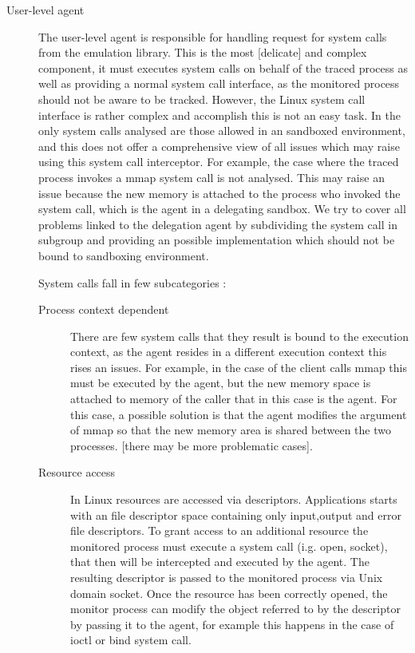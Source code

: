 \begin{description}
	\item[User-level agent]  The user-level agent is responsible for handling request for system calls from the emulation library. This is the most [delicate] and complex 
							 component, it must executes system calls on behalf of the traced process as well as providing a normal system call interface, as the monitored
							 process should not be aware to be tracked. However, the Linux system call interface is rather complex and accomplish this is not an easy task. 
							 In \citep{Garfinkel03ostia:a} the only system calls analysed are those  allowed in an sandboxed environment, and this does not offer a
							 comprehensive view of all issues which may raise using this system call interceptor. For example, the case where the traced process invokes a mmap 
							 system call is not analysed. This may raise an issue because the new memory is attached to the process who invoked the system call, which is the 
							 agent in a delegating sandbox. We try to cover all problems linked to the delegation agent by subdividing the system call in subgroup and providing
							  an possible implementation which should not be bound to sandboxing environment. 
							 
							 System calls fall in few subcategories : 
							 
							 \begin{description}
							 \item[Process context dependent] There are few system calls that they result is bound to the execution context, as the agent resides in a different 
							 								  execution context this rises an issues. For example, in the case of the client calls mmap this must be executed 
							 								  by the agent, but the new memory space is attached to memory of the caller that in this case is the agent. 
							 								  For this case, a possible solution is that the agent modifies the argument of mmap so that the new memory area 
							 								  is shared between the two processes. [there may be more problematic cases].   
							 								
							 \item[Resource access] In Linux resources are accessed via descriptors. Applications starts with an file descriptor space containing only
							 						input,output and error file descriptors. To grant access to an additional resource the monitored process must execute a 
							 						system call (i.g. open, socket), that then will be intercepted and executed by the agent. The resulting descriptor is
							 						passed to the monitored process via Unix domain socket. Once the resource has been correctly opened, the monitor process 
							 						can modify the object referred to by the descriptor by passing it to the agent, for example this happens in the case of 
							 						ioctl or bind system call. 
							 						

\end{description}
\end{description}
